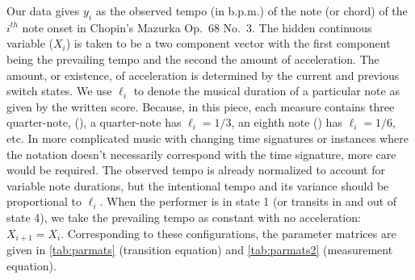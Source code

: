 \documentclass[aoas]{imsart}
\begin{document}
Our data gives $y_i$ as the observed tempo (in b.p.m.) of the note (or
chord) of the $i^{th}$ note onset in Chopin's Mazurka Op.\ 68 No.\ 3. The
hidden continuous variable ($X_i$) is 
taken to be a two component vector with the first component being the
prevailing tempo and the second the amount of acceleration. The amount, or
existence, of acceleration is determined by the current and previous
switch states. We use $\ell_i$ to denote the musical duration of
a particular note as given by the written score. Because, in this
piece, each measure contains three quarter-note, (\quarternote), a quarter-note has $\ell_i=1/3$, an
eighth note (\eighthnote) has $\ell_i=1/6$, etc. In more complicated
music with changing time signatures or instances where the notation
doesn't necessarily correspond with the time signature, more care
would be required. The observed tempo is already normalized to account
for variable note durations, but the intentional tempo and its
variance should be proportional to $\ell_i$. When the performer is in state 1 (or
transits in and out of state 4), we take the prevailing tempo as
constant with no acceleration: $X_{i+1} = X_i$. 
Corresponding to these configurations, the parameter
matrices are given in \autoref{tab:parmats} (transition equation) and
\autoref{tab:parmats2} (measurement equation).
\end{document}
